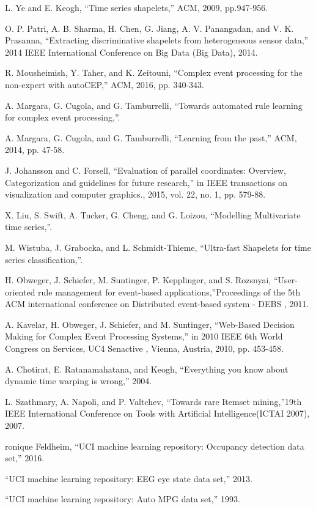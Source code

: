 \documentclass[conference]{IEEEtran}  %
\begin{document}
\begin{thebibliography}{9}

 L. Ye and E. Keogh, \enquote{Time series shapelets,} ACM, 2009, pp.947-956.

 O. P. Patri, A. B. Sharma, H. Chen, G. Jiang, A. V. Panangadan, and V. K. Prasanna, \enquote{Extracting discriminative shapelets from heterogeneous sensor data,} 2014 IEEE International Conference on Big Data (Big Data), 2014.

 R. Mousheimish, Y. Taher, and K. Zeitouni, \enquote{Complex event processing for the non-expert with autoCEP,} ACM, 2016, pp. 340-343.


A. Margara, G. Cugola, and G. Tamburrelli, \enquote{Towards automated rule learning for complex event processing,}.

 A. Margara, G. Cugola, and G. Tamburrelli, \enquote{Learning from the past,} ACM, 2014, pp. 47-58.

 J. Johansson and C. Forsell, \enquote{Evaluation of parallel coordinates: Overview, Categorization and guidelines for future research,} in IEEE transactions on visualization and computer graphics., 2015, vol. 22, no. 1, pp. 579-88.


X. Liu, S. Swift, A. Tucker, G. Cheng, and G. Loizou, \enquote{Modelling Multivariate time series,}.

 
 M. Wistuba, J. Grabocka, and L. Schmidt-Thieme, \enquote{Ultra-fast Shapelets for time series classification,}.


 H. Obweger, J. Schiefer, M. Suntinger, P. Kepplinger, and S. Rozsnyai, \enquote{User-oriented rule management for event-based applications,}Proceedings of the 5th ACM international conference on Distributed event-based system - DEBS , 2011.


  A. Kavelar, H. Obweger, J. Schiefer, and M. Suntinger, \enquote{Web-Based Decision Making for Complex Event Processing Systems,} in 2010 IEEE 6th World Congress on Services, UC4 Senactive , Vienna, Austria, 2010, pp. 453-458.


 A. Chotirat, E. Ratanamahatana, and Keogh, \enquote{Everything you know about dynamic time warping is wrong,} 2004.


 L. Szathmary, A. Napoli, and P. Valtchev, \enquote{Towards rare Itemset mining,}19th IEEE International Conference on Tools with Artificial Intelligence(ICTAI 2007), 2007.


 ronique Feldheim, \enquote{UCI machine learning repository: Occupancy detection data set,} 2016.

 \enquote{UCI machine learning repository: EEG eye state data set,} 2013.

 \enquote{UCI machine learning repository: Auto MPG data set,} 1993.

\end{thebibliography}
\end{document}
